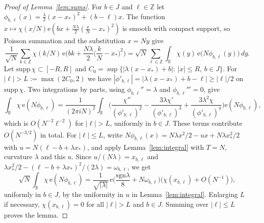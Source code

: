 \documentclass[11pt,reqno]{amsart}
\theoremstyle{definition}
\newcommand{\Z}{\mathbb{Z}}
\newcommand{\R}{\mathbb{R}}
\newcommand{\e}{\mathrm{e}}
\begin{document}
\begin{proof}[Proof of Lemma~\ref{lem:sums}]
For $b\in J$ and $\ell\in\Z$ let $\phi_{b,\ell}(x)=\frac\lambda2(x-x_*)^2+(b-\ell)x$. The function $x\mapsto\chi(x/N)\e(bx+\frac{N\lambda}2(\frac xN-x_*)^2)$ is smooth with compact support, so Poisson summation and the substitution $x=Ny$ give
\[
\frac1{\sqrt N}\sum_{k\in\Z}\chi(k/N)\,\e\Big(bk+\frac{N\lambda}2\Big(\frac kN-x_*\Big)^2\Big)=\sqrt N\sum_{\ell\in\Z}\int_\R\chi(y)\,\e\big(N\phi_{b,\ell}(y)\big)\,dy .
\]
Let $\mathrm{supp}\,\chi\subset[-R,R]$ and $C_0=\sup\{|\lambda(x-x_*)+b|:\ |x|\le R,\ b\in J\}$. For $|\ell|>L:=\max(2C_0,2)$ we have $|\phi'_{b,\ell}|=|\lambda(x-x_*)+b-\ell|\ge|\ell|/2$ on $\mathrm{supp}\,\chi$. Two integrations by parts, using $\phi_{b,\ell}''=\lambda$ and $\phi_{b,\ell}'''=0$, give
\[
\int_\R\chi\,\e(N\phi_{b,\ell})=\frac1{(2\pi iN)^2}\int_\R\Big(\frac{\chi''}{(\phi'_{b,\ell})^2}-\frac{3\lambda\chi'}{(\phi'_{b,\ell})^3}+\frac{3\lambda^2\chi}{(\phi'_{b,\ell})^4}\Big)\e(N\phi_{b,\ell}),
\]
which is $O(N^{-2}\ell^{-2})$ for $|\ell|>L$, uniformly in $b\in J$. These terms contribute $O(N^{-3/2})$ in total. For $|\ell|\le L$, write $N\phi_{b,\ell}(x)=N\lambda x^2/2-ux+N\lambda x_*^2/2$ with $u=N(\ell-b+\lambda x_*)$, and apply Lemma~\ref{lem:integral} with $T=N$, curvature $\lambda$ and this $u$. Since $u/(N\lambda)=x_{b,\ell}$ and $\lambda x_*^2/2-(\ell-b+\lambda x_*)^2/(2\lambda)=\omega_{b,\ell}$, we get
\[
\sqrt N\int_\R\chi\,\e(N\phi_{b,\ell})=\frac1{\sqrt{|\lambda|}}\,\e\Big(\frac{\mathrm{sgn}\lambda}8+N\omega_{b,\ell}\Big)\big(\chi(x_{b,\ell})+O(N^{-1})\big),
\]
uniformly in $b\in J$, by the uniformity in $u$ in Lemma~\ref{lem:integral}. Enlarging $L$ if necessary, $\chi(x_{b,\ell})=0$ for all $|\ell|>L$ and $b\in J$. Summing over $|\ell|\le L$ proves the lemma.
\end{proof}
\end{document}
